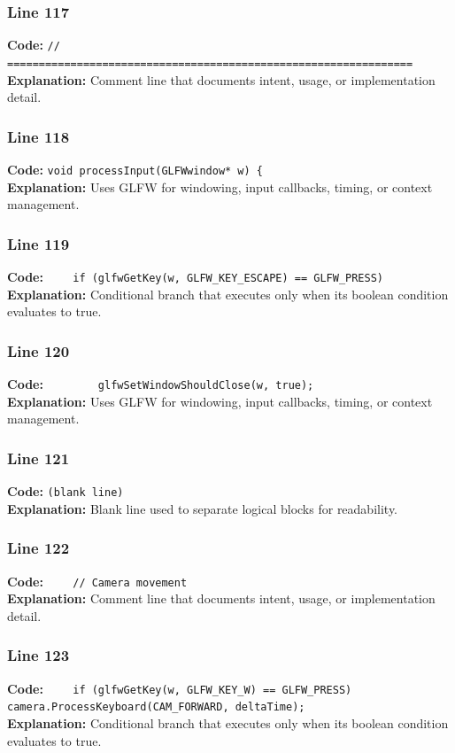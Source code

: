 \documentclass[11pt,a4paper]{article}
\begin{document}
\subsubsection*{Line 117}
\textbf{Code:} \verb|// ================================================================|\\
\textbf{Explanation:} Comment line that documents intent, usage, or implementation detail.

\subsubsection*{Line 118}
\textbf{Code:} \verb|void processInput(GLFWwindow* w) {|\\
\textbf{Explanation:} Uses GLFW for windowing, input callbacks, timing, or context management.

\subsubsection*{Line 119}
\textbf{Code:} \verb|    if (glfwGetKey(w, GLFW_KEY_ESCAPE) == GLFW_PRESS)|\\
\textbf{Explanation:} Conditional branch that executes only when its boolean condition evaluates to true.

\subsubsection*{Line 120}
\textbf{Code:} \verb|        glfwSetWindowShouldClose(w, true);|\\
\textbf{Explanation:} Uses GLFW for windowing, input callbacks, timing, or context management.

\subsubsection*{Line 121}
\textbf{Code:} \texttt{(blank line)}\\
\textbf{Explanation:} Blank line used to separate logical blocks for readability.

\subsubsection*{Line 122}
\textbf{Code:} \verb|    // Camera movement|\\
\textbf{Explanation:} Comment line that documents intent, usage, or implementation detail.

\subsubsection*{Line 123}
\textbf{Code:} \verb|    if (glfwGetKey(w, GLFW_KEY_W) == GLFW_PRESS) camera.ProcessKeyboard(CAM_FORWARD, deltaTime);|\\
\textbf{Explanation:} Conditional branch that executes only when its boolean condition evaluates to true.
\end{document}
